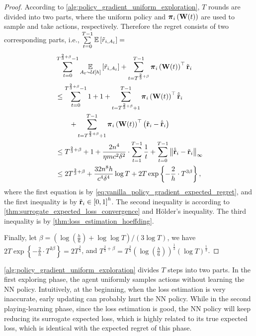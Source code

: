 \begin{proof}
According to \cref{alg:policy_gradient_uniform_exploration}, $T$ rounds are divided into two parts, where the uniform policy and ${\boldsymbol{\pi}}_i\left( {\mathbf{W}}(t) \right)$ are used to sample and take actions, respectively. Therefore the regret consists of two corresponding parts, i.e., $\sum\limits_{t=0}^{T-1}{ {\mathbb{E}} \left[ \tilde{r}_{i, A_t} \right] } =$
\begin{equation*}
\begin{split}
     &\sum\limits_{t=0}^{T^{\frac{2}{3} + \beta} - 1}{ \operatorname*{{\mathbb{E}}}\limits_{A_t \sim {\mathcal{U}}\left[h\right]}{ \left[ \tilde{r}_{i, A_t} \right] }} + \sum\limits_{t=T^{\frac{2}{3} + \beta}}^{T-1}{ {\boldsymbol{\pi}}_i\left( {\mathbf{W}}(t) \right)^\top {\tilde{\mathbf{r}}}_i } \\
     &\le \sum\limits_{t=0}^{T^{\frac{2}{3} + \beta} - 1}{ 1 } + 1 + \sum\limits_{t=T^{\frac{2}{3} + \beta} + 1}^{T-1}{ {\boldsymbol{\pi}}_i\left( {\mathbf{W}}(t) \right)^\top \hat{{\tilde{\mathbf{r}}}}_i } \\
     &\qquad + \sum\limits_{t=T^{\frac{2}{3} + \beta} + 1}^{T-1}{ {\boldsymbol{\pi}}_i\left( {\mathbf{W}}(t) \right)^\top \left( {\tilde{\mathbf{r}}}_i -  \hat{{\tilde{\mathbf{r}}}}_i \right) }  \\
     &\le T^{\frac{2}{3} + \beta } + 1 + \frac{2n^4}{\eta m c^2 \delta^2} \cdot \sum\limits_{t=1}^{T-1}{ \frac{1}{t} } +  \sum\limits_{t=0}^{T-1}{ \left\| \hat{{\tilde{\mathbf{r}}}}_i - {\tilde{\mathbf{r}}}_i \right\|_\infty } \\
     &\le 2 T^{\frac{2}{3} + \beta } + \frac{32n^8h}{ c^4 \delta^4}\log{T} + 2 T \exp\left\{ - \frac{2}{h} \cdot  T^{3\beta} \right\},
\end{split}
\end{equation*}
where the first equation is by \cref{eq:vanilla_policy_gradient_expected_regret}, and the first inequality is by ${\tilde{\mathbf{r}}}_i \in \left[ 0, 1\right]^h$. The second inequality is according to \cref{thm:surrogate_expected_loss_convergence} and H{\"o}lder's inequality. The third inequality is by \cref{thm:loss_estimation_hoeffding}.

Finally, let $\beta = \left( \log{\left(\frac{h}{6}\right) + \log{\log{T}} } \right)/\left(3 \log{T}\right)$, we have $2 T \exp\left\{ - \frac{2}{h} \cdot  T^{3\beta} \right\} = 2 T^{\frac{2}{3}}$, and $T^{\frac{2}{3} + \beta} = T^{\frac{2}{3}}\left( \log{\left(\frac{h}{6}\right)}\right)^{\frac{1}{3}} \left(\log{T}\right)^{\frac{1}{3}}$.
\end{proof}

\cref{alg:policy_gradient_uniform_exploration} divides $T$ steps into two parts. In the first exploring phase, the agent uniformly samples actions without learning the NN policy. Intuitively, at the beginning, when the loss estimation is very inaccurate, early updating can probably hurt the NN policy.  While in the second playing-learning phase, since the loss estimation is good, the NN policy will keep reducing its surrogate expected loss, which is highly related to its true expected loss, which is identical with the expected regret of this phase.

